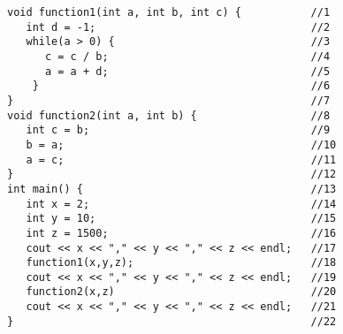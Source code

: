\documentclass{article}
\begin{document}
\begin{lstlisting}
void function1(int a, int b, int c) {           //1
   int d = -1;                                  //2
   while(a > 0) {                               //3
      c = c / b;                                //4
      a = a + d;                                //5
    }                                           //6
}                                               //7
void function2(int a, int b) {                  //8
   int c = b;                                   //9
   b = a;                                       //10
   a = c;                                       //11
}                                               //12
int main() {                                    //13
   int x = 2;                                   //14
   int y = 10;                                  //15
   int z = 1500;                                //16
   cout << x << "," << y << "," << z << endl;   //17
   function1(x,y,z);                            //18
   cout << x << "," << y << "," << z << endl;   //19
   function2(x,z)                               //20
   cout << x << "," << y << "," << z << endl;   //21
}                                               //22
\end{lstlisting}
\\~\\ 
\end{document}
